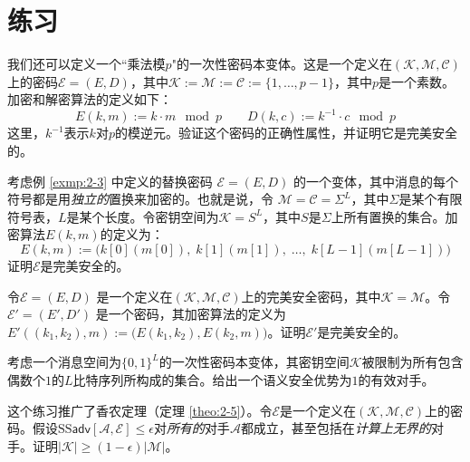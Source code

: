 \section{练习}

\begin{exercise}[乘性一次性密码本]\label{exer:2-1}
我们还可以定义一个``乘法模$p$"的一次性密码本变体。这是一个定义在$(\mathcal{K},\mathcal{M},\mathcal{C})$上的密码$\mathcal{E}=(E,D)$，其中$\mathcal{K}:=\mathcal{M}:=\mathcal{C}:=\{1,\dots,p-1\}$，其中$p$是一个素数。加密和解密算法的定义如下：
\[
E(k,m):=k\cdot m \mod p\quad\quad
D(k,c):=k^{-1}\cdot c \mod p
\]
这里，$k^{-1}$表示$k$对$p$的模逆元。验证这个密码的正确性属性，并证明它是完美安全的。
\end{exercise}

\begin{exercise}[一个好的替换密码]\label{exer:2-2}
考虑例 \ref{exmp:2-3} 中定义的替换密码 $\mathcal{E}=(E,D)$ 的一个变体，其中消息的每个符号都是用\emph{独立的}置换来加密的。也就是说，令 $\mathcal{M}=\mathcal{C}=\Sigma^L$，其中$\Sigma$是某个有限符号表，$L$是某个长度。令密钥空间为$\mathcal{K}=S^L$，其中$S$是$\Sigma$上所有置换的集合。加密算法$E(k, m)$的定义为：
\[
E(k,m):=\Big(k[0](m[0]),\;k[1](m[1]),\;\dots,\;k[L-1](m[L-1])\Big)
\]
证明$\mathcal{E}$是完美安全的。
\end{exercise}

\begin{exercise}[链式加密]\label{exer:2-3}
令$\mathcal{E}=(E,D)$ 是一个定义在$(\mathcal{K},\mathcal{M},\mathcal{C})$上的完美安全密码，其中$\mathcal{K}=\mathcal{M}$。令$\mathcal{E}'=(E',D')$ 是一个密码，其加密算法的定义为 $E'((k_1,k_2),m):=\big(E(k_1,k_2),E(k_2,m)\big)$。证明$\mathcal{E}'$是完美安全的。
\end{exercise}

\begin{exercise}[被破坏的一次性密码本]\label{exer:2-4}
考虑一个消息空间为$\{0,1\}^L$的一次性密码本变体，其密钥空间$\mathcal{K}$被限制为所有包含偶数个$1$的$L$比特序列所构成的集合。给出一个语义安全优势为$1$的有效对手。
\end{exercise}

\begin{exercise}[更强的不可能结果]\label{exer:2-5}
这个练习推广了香农定理（定理 \ref{theo:2-5}）。令$\mathcal{E}$是一个定义在$(\mathcal{K},\mathcal{M},\mathcal{C})$上的密码。假设$\mathrm{SS}\mathsf{adv}[\mathcal{A},\mathcal{E}]\leq\epsilon$对\emph{所有的}对手$\mathcal{A}$都成立，甚至包括在\emph{计算上无界的}对手。证明$|\mathcal{K}|\geq(1-\epsilon)|\mathcal{M}|$。
\end{exercise}

